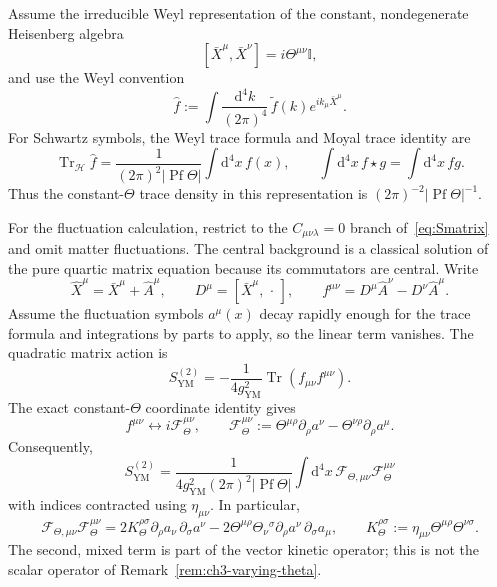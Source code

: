 \begin{remark}
  \label{rem:ch3-trace-quadratic}
Assume the irreducible Weyl representation of the constant,
nondegenerate Heisenberg algebra
\[
  [\bar X^\mu,\bar X^\nu]
  =i\Theta^{\mu\nu}\mathbb{I},
\]
and use the Weyl convention
\[
  \hat f
  :=\int\frac{\mathrm{d}^4k}{(2\pi)^4}\,
       \widetilde f(k)e^{ik_\mu\bar X^\mu}.
\]
For Schwartz symbols, the Weyl trace formula and Moyal trace
identity are
\[
  \operatorname{Tr}_{\mathcal H}\hat f
  =\frac{1}{(2\pi)^2|\operatorname{Pf}\Theta|}
       \int\mathrm{d}^4x\,f(x),
  \qquad
  \int\mathrm{d}^4x\, f\star g
  =\int\mathrm{d}^4x\,fg .
\]
Thus the constant-\(\Theta\) trace density in this representation is
\((2\pi)^{-2}|\operatorname{Pf}\Theta|^{-1}\).

For the fluctuation calculation, restrict to the
\(C_{\mu\nu\lambda}=0\) branch of~\eqref{eq:Smatrix} and omit matter
fluctuations. The central background is a classical solution of the
pure quartic matrix equation because its commutators are central.
Write
\[
  \hat X^\mu=\bar X^\mu+\hat A^\mu,\qquad
  D^\mu=[\bar X^\mu,\,\cdot\,],\qquad
  f^{\mu\nu}=D^\mu\hat A^\nu-D^\nu\hat A^\mu .
\]
Assume the fluctuation symbols \(a^\mu(x)\) decay rapidly enough for
the trace formula and integrations by parts to apply, so the linear
term vanishes. The quadratic matrix action is
\[
  S_{\mathrm{YM}}^{(2)}
  =-\frac{1}{4g_{\mathrm{YM}}^2}
       \operatorname{Tr}(f_{\mu\nu}f^{\mu\nu}).
\]
The exact constant-\(\Theta\) coordinate identity gives
\[
  f^{\mu\nu}\longleftrightarrow
       i\mathcal F_\Theta^{\mu\nu},\qquad
  \mathcal F_\Theta^{\mu\nu}
  :=\Theta^{\mu\rho}\partial_\rho a^\nu
    -\Theta^{\nu\rho}\partial_\rho a^\mu .
\]
Consequently,
\[
  \boxed{
  S_{\mathrm{YM}}^{(2)}
  =\frac{1}{4g_{\mathrm{YM}}^2(2\pi)^2
                 |\operatorname{Pf}\Theta|}
       \int\mathrm{d}^4x\,
       \mathcal F_{\Theta,\mu\nu}\mathcal F_\Theta^{\mu\nu}}
\]
with indices contracted using \(\eta_{\mu\nu}\). In particular,
\[
  \mathcal F_{\Theta,\mu\nu}\mathcal F_\Theta^{\mu\nu}
  =2K_\Theta^{\rho\sigma}
       \partial_\rho a_\nu\,\partial_\sigma a^\nu
   -2\Theta^{\mu\rho}\Theta_\nu{}^\sigma
       \partial_\rho a^\nu\,\partial_\sigma a_\mu,
  \qquad
  K_\Theta^{\rho\sigma}
  :=\eta_{\mu\nu}\Theta^{\mu\rho}\Theta^{\nu\sigma}.
\]
The second, mixed term is part of the vector kinetic operator; this
is not the scalar operator of
Remark~\ref{rem:ch3-varying-theta}.


\end{remark}
